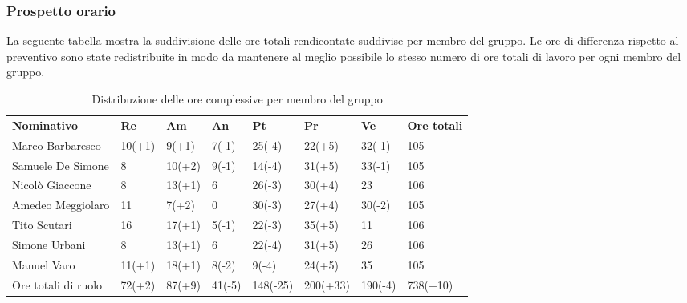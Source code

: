 \subsubsection{Prospetto orario}
La seguente tabella mostra la suddivisione delle ore totali rendicontate suddivise per membro del gruppo. Le ore di differenza rispetto al preventivo sono state redistribuite in modo da mantenere al meglio possibile lo stesso numero di ore totali di lavoro per ogni membro del gruppo.
\begin{center}
    \begin{table}[ht!]
        \centering
        \caption{Distribuzione delle ore complessive per membro del gruppo}
        \vspace{5px}
        \renewcommand{\arraystretch}{1.8}
        \begin{tabular}{p{100px} p{30px} p{30px} p{35px} p{40px} p{40px} p{35px} p{50px} }
            \rowcolor{logo!70} \textbf{Nominativo} & \textbf{Re} & \textbf{Am} & \textbf{An} & \textbf{Pt} & \textbf{Pr} & \textbf{Ve} & \textbf{Ore totali} \\
            Marco Barbaresco                       & 10(+1)      & 9(+1)           & 7(-1)      & 25(-4)      & 22(+5)      & 32(-1)      & 105                 \\
            Samuele De Simone                      & 8           & 10(+2)          & 9(-1)      & 14(-4)      & 31(+5)      & 33(-1)      & 105                 \\
            Nicolò Giaccone                        & 8           & 13(+1)          & 6          & 26(-3)      & 30(+4)      & 23          & 106                 \\
            Amedeo Meggiolaro                      & 11          & 7(+2)           & 0          & 30(-3)      & 27(+4)      & 30(-2)      & 105                 \\
            Tito Scutari                           & 16          & 17(+1)          & 5(-1)      & 22(-3)      & 35(+5)      & 11          & 106                 \\
            Simone Urbani                          & 8           & 13(+1)          & 6          & 22(-4)      & 31(+5)      & 26          & 106                 \\
            Manuel Varo                            & 11(+1)      & 18(+1)          & 8(-2)      & 9(-4)       & 24(+5)      & 35          & 105                 \\
            Ore totali di ruolo                    & 72(+2)      & 87(+9)          & 41(-5)     & 148(-25)    & 200(+33)    & 190(-4)     & 738(+10)            \\
        \end{tabular}
    \end{table}
\end{center}

